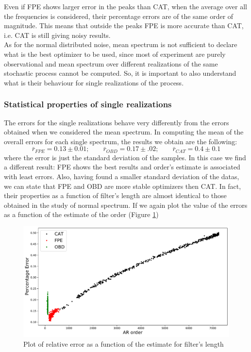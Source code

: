 \documentclass[twocolumn,showpacs,preprintnumbers,nofootinbib,prd,
superscriptaddress,10pt]{revtex4-1}
\begin{document}
Even if FPE shows larger error in the peaks than CAT, when the average over all the frequencies is considered, their percentage errors are of the same order of magnitude. This means that outside the peaks FPE is more accurate than CAT, i.e. CAT is still giving noisy results.\\ 
As for the normal distributed noise, mean spectrum is not sufficient to declare what is the best optimizer to be used, since most of experiment are purely observational and mean spectrum over different realizations of the same stochastic process cannot be computed. So, it is important to also understand what is their behaviour for single realizations of the process.
\subsubsection{Statistical properties of single realizations} 
The errors for the single realizations behave very differently from the errors obtained when we considered the mean spectrum. In computing the mean of the overall errors for each single spectrum, the results we obtain are the following:
\begin{equation}
    \bar{r}_{FPE} = 0.13 \pm 0.01; \qquad \bar{r}_{OBD} = 0.17 \pm .02; \qquad 
    \bar{r}_{CAT} = 0.4 \pm 0.1
\end{equation}
where the error is just the standard deviation of the samples.
In this case we find a different result: FPE shows the best results and order's estimate is associated with least errors. Also, having found a smaller standard deviation of the datas, we can state that FPE and OBD are more stable optimizers then CAT. In fact, their properties as a function of filter's length are almost identical to those obtained in the study of normal spectrum. If we again plot the value of the errors as a function of the estimate of the order (Figure \ref{fig:LigoOrderError})
\begin{figure}
    \centering
    \includegraphics[width = \linewidth]{Images/LIGOsimulate/orderVSerror.pdf}
    \caption{Plot of relative error as a function of the estimate for filter's length}
    \label{fig:LigoOrderError}
\end{figure}
\end{document}
